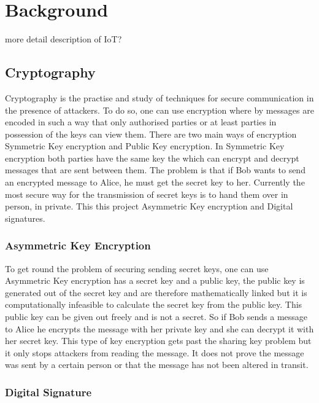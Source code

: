 
\chapter{Background}
\label{back}

more detail description of IoT?

\section{Cryptography}

Cryptography is the practise and study of techniques for secure communication in the presence of attackers. To do so, one can use encryption where by messages are encoded in such a way that only authorised parties or at least parties in possession of the keys can view them. There are two main ways of encryption Symmetric Key encryption and Public Key encryption. In Symmetric Key encryption both parties have the same key the which can encrypt and decrypt messages that are sent between them. The problem is that if Bob wants to send an encrypted message to Alice, he must get the secret key to her. Currently the most secure way for the transmission of secret keys is to hand them over in person, in private. This this project Asymmetric Key encryption and Digital signatures.

\subsection{Asymmetric Key Encryption}

To get round the problem of securing sending secret keys, one can use Asymmetric Key encryption has a secret key and a public key, the public key is generated out of the secret key and are therefore mathematically linked but it is computationally infeasible to calculate the secret key from the public key. This public key can be given out freely and is not a secret. So if Bob sends a message to Alice he encrypts the message with her private key and she can decrypt it with her secret key. This type of key encryption gets past the sharing key problem but it only stops attackers from reading the message. It does not prove the message was sent by a certain person or that the message has not been altered in transit.

\subsection{Digital Signature}

